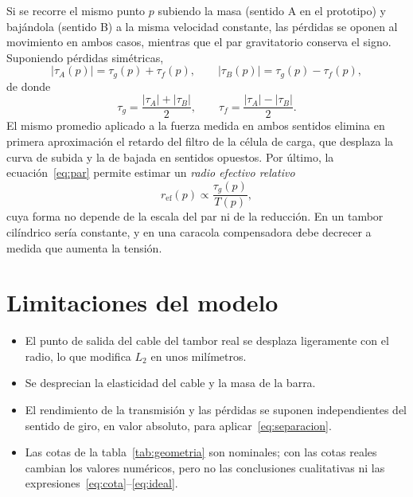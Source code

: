 Si se recorre el mismo punto $p$ subiendo la masa (sentido A en el prototipo) y bajándola (sentido
B) a la misma velocidad constante, las pérdidas se oponen al movimiento en ambos casos, mientras que
el par gravitatorio conserva el signo. Suponiendo pérdidas simétricas,
\begin{equation}
  |\tau_A(p)| = \tau_g(p) + \tau_f(p), \qquad |\tau_B(p)| = \tau_g(p) - \tau_f(p),
\end{equation}
de donde
\begin{equation}
  \tau_g = \frac{|\tau_A| + |\tau_B|}{2}, \qquad \tau_f = \frac{|\tau_A| - |\tau_B|}{2}.
  \label{eq:separacion}
\end{equation}
El mismo promedio aplicado a la fuerza medida en ambos sentidos elimina en primera aproximación el
retardo del filtro de la célula de carga, que desplaza la curva de subida y la de bajada en sentidos
opuestos. Por último, la ecuación~\eqref{eq:par} permite estimar un \emph{radio efectivo relativo}
\begin{equation}
  r_{\text{ef}}(p) \propto \frac{\tau_g(p)}{T(p)},
  \label{eq:radio-efectivo}
\end{equation}
cuya forma no depende de la escala del par ni de la reducción. En un tambor cilíndrico sería
constante, y en una caracola compensadora debe decrecer a medida que aumenta la tensión.

\section{Limitaciones del modelo}

\begin{itemize}
  \item El punto de salida del cable del tambor real se desplaza ligeramente con el radio, lo que
        modifica $L_2$ en unos milímetros.
  \item Se desprecian la elasticidad del cable y la masa de la barra.
  \item El rendimiento de la transmisión y las pérdidas se suponen independientes del sentido de
        giro, en valor absoluto, para aplicar~\eqref{eq:separacion}.
  \item Las cotas de la tabla~\ref{tab:geometria} son nominales; con las cotas reales cambian los
        valores numéricos, pero no las conclusiones cualitativas ni las
        expresiones~\eqref{eq:cota}--\eqref{eq:ideal}.
\end{itemize}
